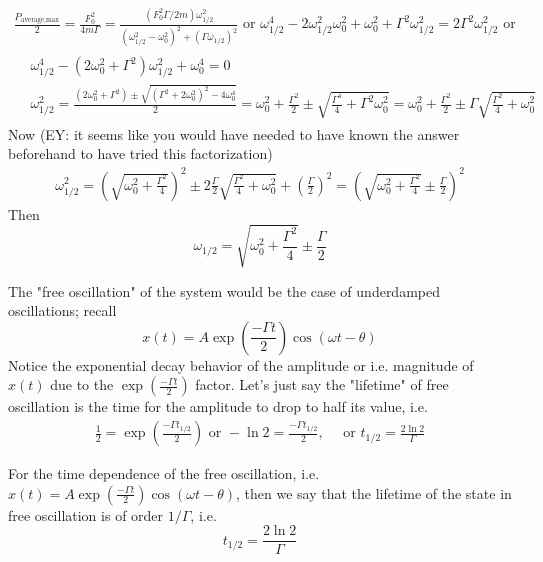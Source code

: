 \documentclass[10pt]{amsart}
\begin{document}
\begin{multicols*}{2}
\[
\begin{gathered}
\frac{P_{\text{average,max}}}{2} = \frac{F_0^2}{4m \Gamma} = \frac{ (F_0^2 \Gamma /2m ) \omega_{1/2}^2 }{ (\omega_{1/2}^2 - \omega_0^2)^2 + (\Gamma \omega_{1/2})^2 } \text{ or } \omega_{1/2}^4 -2\omega_{1/2}^2 \omega_0^2 + \omega_0^2 + \Gamma^2 \omega_{1/2}^2 = 2\Gamma^2 \omega_{1/2}^2 \text{ or } \\
\begin{aligned}
& \omega_{1/2}^4 - (2\omega_0^2 + \Gamma^2) \omega_{1/2}^2 + \omega_0^4 = 0 \\
& \omega_{1/2}^2 = \frac{ (2 \omega_0^2 + \Gamma^2) \pm \sqrt{ ( \Gamma^2 + 2\omega_0^2)^2 - 4\omega_0^4 } }{2} = \omega_0^2 + \frac{ \Gamma^2}{2} \pm \sqrt{ \frac{\Gamma^4 }{4}  + \Gamma^2 \omega_0^2 } = \omega_0^2 + \frac{ \Gamma^2}{2} \pm \Gamma \sqrt{ \frac{\Gamma^2 }{4}  +  \omega_0^2 }
\end{aligned}
\end{gathered}
\]
Now (EY: it seems like you would have needed to have known the answer beforehand to have tried this factorization)
\[
\begin{gathered}
\omega_{1/2}^2 = \left( \sqrt{ \omega_0^2 + \frac{\Gamma^2}{4} } \right)^2 \pm 2 \frac{\Gamma}{2} \sqrt{ \frac{\Gamma^2}{4} + \omega_0^2 } + \left( \frac{\Gamma}{2} \right)^2  = \left( \sqrt{ \omega_0^2 + \frac{ \Gamma^2}{4} } \pm \frac{\Gamma}{2} \right)^2
\end{gathered}
\]
Then
\begin{equation}
\boxed{ \omega_{1/2} = \sqrt{ \omega_0^2 + \frac{\Gamma^2}{4} } \pm \frac{\Gamma}{2} }
\end{equation}

The "free oscillation" of the system would be the case of underdamped oscillations; recall
\[
x(t) = A \exp{ \left( \frac{-\Gamma t}{2} \right) }\cos{ (\omega t - \theta) }
\]
Notice the exponential decay behavior of the amplitude or i.e. magnitude of $x(t)$ due to the $\exp{ \left( \frac{-\Gamma t}{2} \right)}$ factor. Let's just say the "lifetime" of free oscillation is the time for the amplitude to drop to half its value, i.e.
\[
\begin{gathered}
\frac{1}{2} = \exp{ \left( \frac{-\Gamma t_{1/2} }{2} \right) } \text{ or } -\ln{2} = \frac{-\Gamma t_{1/2} }{2} , \quad \text{ or } t_{1/2} = \frac{2\ln{2} }{\Gamma}
\end{gathered}
\]

For the time dependence of the free oscillation, i.e. $x(t) = A \exp{ \left( \frac{-\Gamma t}{2} \right) }\cos{ (\omega t - \theta) }$, then we say that the lifetime of the state in free oscillation is of order $1/\Gamma$, i.e.
\[
t_{1/2} = \frac{2\ln{2}}{ \Gamma}
\]


\end{multicols*}
\end{document}

